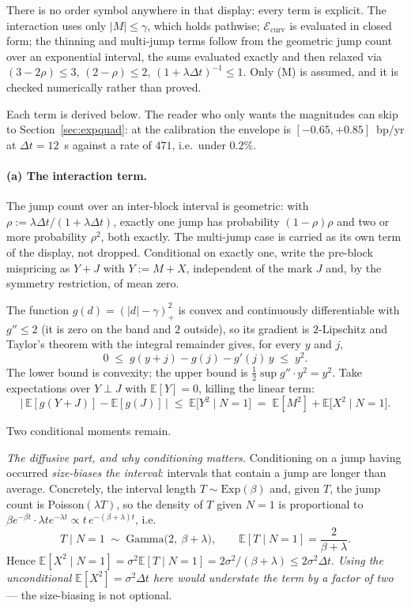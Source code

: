 \documentclass[11pt]{article}
\theoremstyle{definition}
\theoremstyle{remark}
\newcommand{\E}{\mathbb{E}}
\newcommand{\dt}{\Delta t}
\newcommand{\1}{\mathbf{1}}
\begin{document}
There is no order symbol anywhere in that display: every term is explicit. The interaction uses only $|M|\le\gamma$, which holds pathwise; $\mathcal E_{\mathrm{curv}}$ is evaluated in closed form; the thinning and multi-jump terms follow from the geometric jump count over an exponential interval, the sums evaluated exactly and then relaxed via $(3-2\rho)\le3$, $(2-\rho)\le2$, $(1+\lambda\dt)^{-1}\le1$. Only (M) is assumed, and it is checked numerically rather than proved.

Each term is derived below. The reader who only wants the magnitudes can skip to Section~\ref{sec:expquad}: at the calibration the envelope is $[-0.65,+0.85]$~bp/yr at $\dt = 12$~s against a rate of $471$, i.e.\ under $0.2\%$.

\paragraph{(a) The interaction term.}
The jump count over an inter-block interval is geometric: with $\rho:=\lambda\dt/(1+\lambda\dt)$, exactly one jump has probability $(1-\rho)\rho$ and two or more probability $\rho^2$, both exactly. The multi-jump case is carried as its own term of the display, not dropped. Conditional on exactly one, write the pre-block mispricing as $Y + J$ with $Y := M + X$, independent of the mark $J$ and, by the symmetry restriction, of mean zero.

The function $g(d) = (|d|-\gamma)_+^2$ is convex and continuously differentiable with $g''\le 2$ (it is zero on the band and $2$ outside), so its gradient is $2$-Lipschitz and Taylor's theorem with the integral remainder gives, for every $y$ and $j$,
\[
0 \;\le\; g(y+j) - g(j) - g'(j)\,y \;\le\; y^2 .
\]
The lower bound is convexity; the upper bound is $\tfrac12\sup g''\cdot y^2 = y^2$. Take expectations over $Y \perp J$ with $\E[Y] = 0$, killing the linear term:
\[
\big|\,\E[g(Y+J)] - \E[g(J)]\,\big| \;\le\; \E\big[Y^2 \mid N = 1\big] \;=\; \E[M^2] + \E\big[X^2 \mid N=1\big].
\]

Two conditional moments remain.

\emph{The diffusive part, and why conditioning matters.} Conditioning on a jump having occurred \emph{size-biases the interval}: intervals that contain a jump are longer than average. Concretely, the interval length $T \sim \mathrm{Exp}(\beta)$ and, given $T$, the jump count is Poisson$(\lambda T)$, so the density of $T$ given $N = 1$ is proportional to $\beta e^{-\beta t}\cdot\lambda t e^{-\lambda t} \propto t\,e^{-(\beta+\lambda)t}$, i.e.
\[
T \mid N=1 \;\sim\; \mathrm{Gamma}\big(2,\ \beta+\lambda\big),
\qquad \E[T\mid N=1] = \frac{2}{\beta+\lambda} .
\]
Hence $\E[X^2\mid N=1] = \sigma^2\E[T\mid N=1] = 2\sigma^2/(\beta+\lambda) \le 2\sigma^2\dt$. \emph{Using the unconditional $\E[X^2] = \sigma^2\dt$ here would understate the term by a factor of two} --- the size-biasing is not optional.
\end{document}
